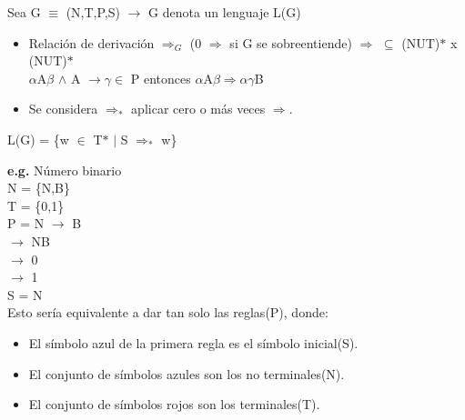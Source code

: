 \documentclass[\main/Apuntes_PL.tex]{subfiles}
\begin{document}
      \bigskip
      \par
      Sea G $\equiv$ (N,T,P,S) $\rightarrow$ G denota un lenguaje L(G)
      \begin{itemize}
        \item Relación de derivación $\Rightarrow_G$ (0 $\Rightarrow$ si G se sobreentiende) $\Rightarrow$ $\subseteq$ (NUT)$\ast$ x (NUT)$\ast$\\
              \hspace{5mm}$\alpha$A$\beta$ $\wedge$ A $\rightarrow \gamma \in$ P entonces $\alpha$A$\beta \Rightarrow \alpha \gamma$B
        \item Se considera $\Rightarrow_\ast$ aplicar cero o más veces $\Rightarrow$.
      \end{itemize}

      \par
      L(G) = \{w $\in$ T$\ast$ $\mid$ S $\Rightarrow_\ast$ w\}

      \bigskip
      \par
      \textbf{e.g.} Número binario\\
      \hspace{5mm}N = \{N,B\}\\
      \hspace{5mm}T = \{0,1\}\\
      \hspace{5mm}P = {\color{blue}N} $\rightarrow$ B\\
       $\rightarrow$ NB\\
       $\rightarrow$ {\color{red}0}\\
       $\rightarrow$ {\color{red}1}\\
      \hspace{5mm}S = N\\
      \vspace{2mm}
      \hspace{5mm}Esto sería equivalente a dar tan solo las reglas(P), donde:
      \begin{itemize}
        \item El símbolo {\color{blue}azul} de la primera regla es el símbolo inicial(S).
        \item El conjunto de símbolos {\color{blue}azules} son los no terminales(N).
        \item El conjunto de símbolos {\color{red}rojos} son los terminales(T).
      \end{itemize}
\end{document}
